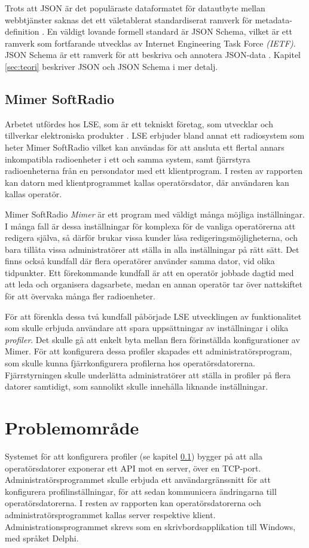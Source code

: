 Trots att JSON är det populäraste dataformatet för datautbyte mellan webbtjänster saknas det ett väletablerat standardiserat ramverk för metadata-definition \cite{Pezoa2016}. En väldigt lovande formell standard är JSON Schema, vilket är ett ramverk som fortfarande utvecklas av Internet Engineering Task Force \textit{(IETF)}. JSON Schema är ett ramverk för att beskriva och annotera JSON-data \cite{A.Wright}. Kapitel \ref{sec:teori} beskriver JSON och JSON Schema i mer detalj.

\subsection{Mimer SoftRadio}
\label{sec:intro:mimer}
Arbetet utfördes hos LSE, som är ett tekniskt företag, som utvecklar och tillverkar elektroniska produkter \cite{Ehne}. LSE erbjuder bland annat ett radiosystem som heter Mimer SoftRadio vilket kan användas för att ansluta ett flertal annars inkompatibla radioenheter i ett och samma system, samt fjärrstyra radioenheterna från en persondator med ett klientprogram. I resten av rapporten kan datorn med klientprogrammet kallas operatörsdator, där användaren kan kallas operatör.

Mimer SoftRadio \textit{Mimer} är ett program med väldigt många möjliga inställningar. I många fall är dessa inställningar för komplexa för de vanliga operatörerna att redigera själva, så därför brukar vissa kunder låsa redigeringsmöjligheterna, och bara tillåta vissa administratörer att ställa in alla inställningar på rätt sätt. Det finns också kundfall där flera operatörer använder samma dator, vid olika tidpunkter. Ett förekommande kundfall är att en operatör jobbade dagtid med att leda och organisera dagsarbete, medan en annan operatör tar över nattskiftet för att övervaka många fler radioenheter.

För att förenkla dessa två kundfall påbörjade LSE utvecklingen av funktionalitet som skulle erbjuda användare att spara uppsättningar av inställningar i olika \textit{profiler}. Det skulle gå att enkelt byta mellan flera förinställda konfigurationer av Mimer. För att konfigurera dessa profiler skapades ett administratörsprogram, som skulle kunna fjärrkonfigurera profilerna hos operatörsdatorerna. Fjärrstyrningen skulle underlätta administratörer att ställa in profiler på flera datorer samtidigt, som sannolikt skulle innehålla liknande inställningar.

\section{Problemområde}
\label{sec:intro:problemområde}
Systemet för att konfigurera profiler (se kapitel \ref{sec:intro:mimer}) bygger på att alla operatörsdatorer exponerar ett API mot en server, över en TCP-port. Administratörsprogrammet skulle erbjuda ett användargränssnitt för att konfigurera profilinställningar, för att sedan kommunicera ändringarna till operatörsdatorerna. I resten av rapporten kan operatörsdatorerna och administratörsprogrammet kallas server respektive klient. Administrationsprogrammet skrevs som en skrivbordsapplikation till Windows, med språket Delphi.

